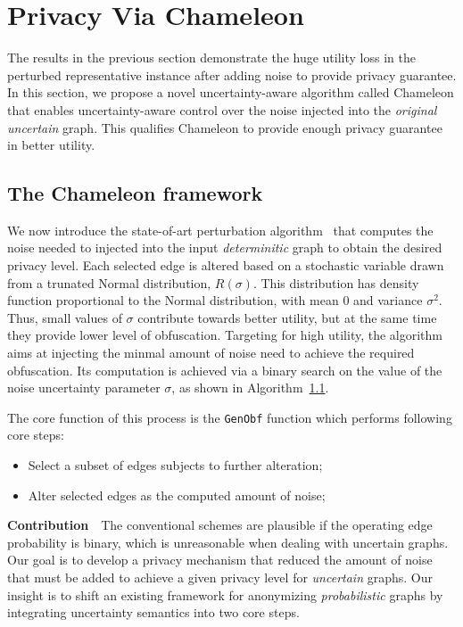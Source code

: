 \section{Privacy Via Chameleon}
The results in the previous section demonstrate the huge utility loss in the perturbed representative instance after adding noise to provide privacy guarantee. In this section, we propose a novel uncertainty-aware algorithm called Chameleon that enables uncertainty-aware control over the noise injected into the \emph{original uncertain} graph. This qualifies Chameleon to provide enough privacy guarantee in better utility. 

\subsection{The Chameleon framework}

We now introduce the state-of-art perturbation algorithm~\cite{Boldi_Injecting_2012} that computes the noise needed to injected into the input \emph{determinitic} graph to obtain the desired privacy level. Each selected edge is altered based on a stochastic variable drawn from a trunated Normal distribution, $R(\sigma)$. This distribution has density function proportional to the Normal distribution, with mean $0$ and variance $\sigma^2$. Thus, small values of $\sigma$ contribute towards better utility, but at the same time they provide lower level of obfuscation. Targeting for high utility, the algorithm aims at injecting the minmal amount of noise need to achieve the required obfuscation. Its computation is achieved via a binary search on the value of the noise uncertainty parameter $\sigma$, as shown in Algorithm~\ref{}. 

The core function of this process is the \texttt{GenObf} function which performs following core steps:
\begin{itemize}
    \item{Select a subset of edges subjects to further alteration;}
    \item{Alter selected edges as the computed amount of noise;}
\end{itemize}

\textbf{Contribution}~~The conventional schemes are plausible if the operating edge probability is binary, which is unreasonable when dealing with uncertain graphs. Our goal is to develop a privacy mechanism that reduced the amount of noise that must be added to achieve a given privacy level for \emph{uncertain} graphs. Our insight is to shift an existing framework for anonymizing \emph{probabilistic} graphs by integrating uncertainty semantics into two core steps. 

